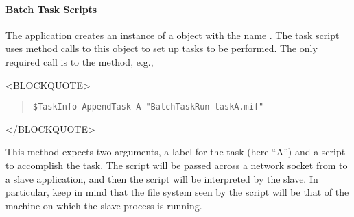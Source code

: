 \paragraph{Batch Task Scripts}\label{sec:batchschedtask}\par
The application  
creates an instance of a  object with
the name .  The task script uses
method calls to this object to set up tasks to be performed.  The only
required call is to the  method, e.g.,
\begin{rawhtml}<BLOCKQUOTE>\end{rawhtml}
\begin{quote}
\begin{verbatim}
$TaskInfo AppendTask A "BatchTaskRun taskA.mif"
\end{verbatim}
\end{quote}
\begin{rawhtml}</BLOCKQUOTE>\end{rawhtml}
This method expects two arguments, a label for the task (here ``A'') and
a script to accomplish the task.  
The script will be passed across a
network socket from 
 to a slave application, and
then the script will be interpreted by the slave.  In particular, keep
in mind that the file system seen by the script will be that of the
machine on which the slave process is running.

